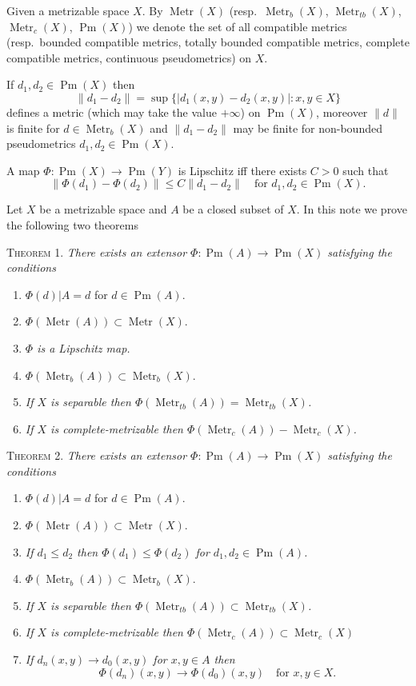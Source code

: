 \documentclass[11pt,a4paper,leqno,twoside]{article}
\newcommand{\Metr}{\operatorname{Metr}}
\newcommand{\Pm}{\operatorname{Pm}}
\newcommand{\norm}[1]{\lVert#1\rVert}
\newcommand{\restr}{\vert}
\newenvironment{conditions}[1]{\begin{enumerate}[label=(#1-\roman*),leftmargin=4.3em,itemsep=1pt,topsep=3pt,parsep=0pt]}{\end{enumerate}}
\begin{document}
Given a metrizable space $X$. By $\Metr(X)$ (resp.\ $\Metr_b(X)$, $\Metr_{tb}(X)$, $\Metr_c(X)$, $\Pm(X)$) we denote the set of all compatible metrics (resp.\ bounded compatible metrics, totally bounded compatible metrics, complete compatible metrics, continuous pseudometrics) on $X$.

If $d_1,d_2\in\Pm(X)$ then
\[\norm{d_1-d_2}=\sup\{|d_1(x,y)-d_2(x,y)|:x,y\in X\}\]
defines a metric (which may take the value $+\infty$) on $\Pm(X)$, moreover $\norm d$ is finite for $d\in\Metr_b(X)$ and $\norm{d_1-d_2}$ may be finite for non-bounded pseudometrics $d_1,d_2\in\Pm(X)$.

A map $\Phi:\Pm(X)\to\Pm(Y)$ is Lipschitz iff there exists $C>0$ such that
\[\norm{\Phi(d_1)-\Phi(d_2)}\leq C\norm{d_1-d_2}\quad\text{for }d_1,d_2\in\Pm(X).\]

\newpage %
Let $X$ be a metrizable space and $A$ be a closed subset of $X$. In this note we prove the following two theorems

\par\medskip\noindent\textsc{Theorem 1.} \textit{There exists an extensor $\Phi:\Pm(A)\to\Pm(X)$ satisfying the conditions}
\begin{conditions}{1}
\item $\Phi(d)\restr A=d$ for $d\in\Pm(A)$.
\item $\Phi(\Metr(A))\subset\Metr(X)$.
\item \textit{$\Phi$ is a Lipschitz map.}
\item $\Phi(\Metr_b(A))\subset\Metr_b(X)$.
\item \textit{If $X$ is separable then $\Phi(\Metr_{tb}(A))=\Metr_{tb}(X)$.}
\item \textit{If $X$ is complete-metrizable then $\Phi(\Metr_c(A))-\Metr_c(X)$.}
\end{conditions}

\par\medskip\noindent\textsc{Theorem 2.} \textit{There exists an extensor $\Phi:\Pm(A)\to\Pm(X)$ satisfying the conditions}
\begin{conditions}{2}
\item $\Phi(d)\restr A=d$ for $d\in\Pm(A)$.
\item $\Phi(\Metr(A))\subset\Metr(X)$.
\item \textit{If $d_1\leq d_2$ then $\Phi(d_1)\leq\Phi(d_2)$ for $d_1,d_2\in\Pm(A)$.}
\item $\Phi(\Metr_b(A))\subset\Metr_b(X)$.
\item \textit{If $X$ is separable then $\Phi(\Metr_{tb}(A))\subset\Metr_{tb}(X)$.}
\item \textit{If $X$ is complete-metrizable then $\Phi(\Metr_c(A))\subset\Metr_c(X)$}
\item \textit{If $d_n(x,y)\to d_0(x,y)$ for $x,y\in A$ then}
\[\Phi(d_n)(x,y)\to\Phi(d_0)(x,y)\quad\text{for }x,y\in X.\]
\end{conditions}
\end{document}
